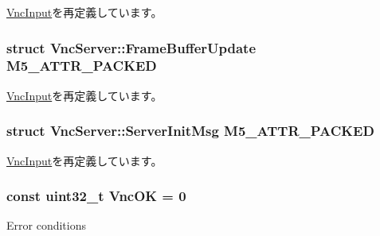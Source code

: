 \hyperlink{classVncInput_a6461d9ad3aa5b6efe59b090c8e8f38af}{VncInput}を再定義しています。\hypertarget{group__VncConstants_ga357314e013d6289c7d085fadd56a290c}{
\subsubsection[{M5\_\-ATTR\_\-PACKED}]{\setlength{\rightskip}{0pt plus 5cm}struct {\bf VncServer::FrameBufferUpdate}  {\bf M5\_\-ATTR\_\-PACKED}}}
\label{group__VncConstants_ga357314e013d6289c7d085fadd56a290c}


\hyperlink{classVncInput_a6461d9ad3aa5b6efe59b090c8e8f38af}{VncInput}を再定義しています。\hypertarget{group__VncConstants_ga2f0a8a1f1c40593e1e01ce4b8087d792}{
\subsubsection[{M5\_\-ATTR\_\-PACKED}]{\setlength{\rightskip}{0pt plus 5cm}struct {\bf VncServer::ServerInitMsg}  {\bf M5\_\-ATTR\_\-PACKED}}}
\label{group__VncConstants_ga2f0a8a1f1c40593e1e01ce4b8087d792}


\hyperlink{classVncInput_a6461d9ad3aa5b6efe59b090c8e8f38af}{VncInput}を再定義しています。\hypertarget{group__VncConstants_ga6d4127ee4f24603d9a0c7e3257b04ca3}{
\subsubsection[{VncOK}]{\setlength{\rightskip}{0pt plus 5cm}const {\bf uint32\_\-t} VncOK = 0}}
\label{group__VncConstants_ga6d4127ee4f24603d9a0c7e3257b04ca3}
Error conditions 